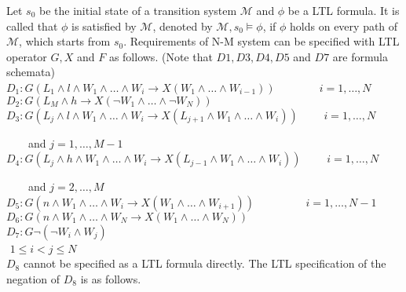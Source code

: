 \documentclass[runningheads,a4paper]{llncs}
\begin{document}
Let $s_0$ be the initial state of a transition system $\mathcal{M}$ and $\phi$ be a LTL formula. It is called that $\phi$ is satisfied by $\mathcal{M}$, denoted by $\mathcal{M}, s_0\models \phi$, if $\phi$ holds on every path of $\mathcal{M}$, which starts from $s_0$. Requirements of N-M system can be specified with LTL operator $G, X$ and $F$ as follows. (Note that $D1, D3, D4, D5$ and $D7$ are formula schemata)\\

$D_1: G(L_1\land l \land W_1\land \ldots \land W_i \rightarrow X(W_1\land \ldots \land W_{i-1}))  $ $   $ $   $ $  $ $  $ $  $ $ $ $   $ $   $ $  $ $  $ $  $ $ i=1,\ldots, N$ \\

$D_2: G(L_M \land h \rightarrow X(\neg W_1 \land \ldots  \land \neg W_N))$ \\

$D_3: G(L_j \land l \land W_1 \land \ldots \land W_i \rightarrow X(L_{j+1} \land W_1 \land \ldots \land W_i))$  $ $   $ $   $ $  $ $  $ $  $ $ $ i=1,\ldots, N$ 

$ $ $ $ $ $ $ $ $ $ $ $  and $j=1, \ldots, M-1$   \\

$D_4: G(L_j \land h \land W_1 \land \ldots \land W_i \rightarrow X(L_{j-1} \land W_1 \land \ldots \land W_i))$  $ $   $ $   $ $  $ $  $ $  $ $   $i=1,\ldots,N$
 
$ $ $ $ $ $ $ $ $ $ $ $ and  $j=2, \ldots, M$ \\ 

$D_5: G(n \land W_1 \land \ldots \land W_i \rightarrow X(W_1 \land \ldots \land W_{i+1}))    $ $   $ $ $ $   $ $   $ $  $ $  $ $  $ $ $ $   $ $   $ $  $ $  $ $  $ $ i=1,\ldots,N-1$  \\ 

$D_6: G(n \land W_1 \land \ldots  \land W_N \rightarrow X(W_1 \land \ldots  \land W_N))$\\

$D_7: G\neg(\neg W_i \land W_j)$  $ $   $ $ $ $   $ $   $ $  $ $  $ $  $ $ $ $   $ $   $ $  $ $  $ $  $ $  $ $   $ $ $ $   $ $   $ $  $ $  $ $  $ $ $ $   $ $   $ $  $ $  $ $  $ $  $ $   $ $ $ $   $ $   $ $  $ $  $ $  $ $ $ $   $ $   $ $  $ $  $ $  $ $  $ $   $ $ $ $   $ $   $ $  $ $  $ $  $ $ $ $   $ $   $ $  $ $  $ $  $ $   $ $   $ $ $ $   $ $   $ $  $ $  $ $  $ $ $ $   $ $   $ $  $ $  $ $  $ $  $ $   $ $ $ $   $ $   $ $  $ $  $ $  $ $ $ $   $ $   $ $      $1 \leq i < j \leq N$\\

$D_8$ cannot be specified as a LTL formula directly. The LTL specification of the negation of $D_8$ is as follows. \\
\end{document}
